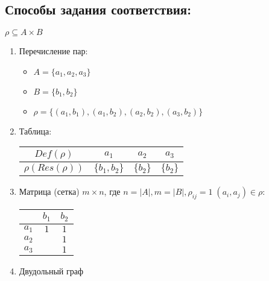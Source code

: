 \documentclass[10pt]{article}
\begin{document}
\subsection*{Способы задания соответствия:}
\par $\rho \subseteq A \times B$
\begin{enumerate}
    \item Перечисление пар:
        \begin{itemize}
            \item $A = \{ a_1, a_2, a_3 \}$
            \item $B = \{ b_1, b_2 \}$
            \item $\rho = \{ (a_1, b_1), (a_1, b_2), (a_2, b_2), (a_3, b_2) \}$
        \end{itemize}
    \item Таблица:
        \par \begin{tabular}{|c|c|c|c|}
            \hline
            $Def(\rho)$ & $a_1$ & $a_2$ & $a_3$ \\
            \hline
            $\rho(Res(\rho))$ & $\{ b_1, b_2 \}$ & $\{ b_2 \}$ & $\{ b_2 \}$ \\
            \hline
        \end{tabular}
    \item Матрица (сетка) $m \times n$, где $n = |A|, m = |B|, \rho_{ij} = 1 \; (a_i, a_j) \in \rho$:
        \par \begin{tabular}{|c|c|c|}
            \hline
             & $b_1$ & $b_2$ \\
            \hline
            $a_1$ & $1$ & $1$ \\
            \hline
            $a_2$ & & $1$ \\
            \hline
            $a_3$ & & $1$ \\
            \hline
        \end{tabular}
    \item Двудольный граф
\end{enumerate}
\end{document}
